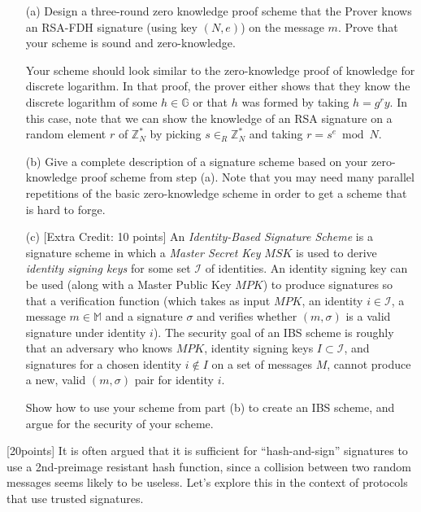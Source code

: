 \documentclass[11pt]{article}
\newcounter{qnum}
\newcommand{\question}[1]{\stepcounter{qnum}\bigskip\noindent{\bf \arabic{qnum}. #1.}}
\begin{document}
\begin{itemize}
\item[(a)] Design a three-round zero knowledge proof scheme that the Prover
  knows an RSA-FDH signature (using key $(N,e)$) on the message $m$.
  Prove that your scheme is sound and zero-knowledge.

  Your scheme should look similar to the zero-knowledge proof of knowledge for
  discrete logarithm.  In that proof, the prover either shows that they
  know the discrete logarithm of some $h \in \mathbb{G}$ or that $h$
  was formed  by taking $h = g^r y$.  In this case, note that we can
  show the knowledge of an RSA signature on a random element $r$ of
  $\mathbb{Z}_N^*$ by picking $s \in_R \mathbb{Z}_N^*$ and taking $r =
  s^e \bmod N$.

\item[(b)] Give a complete description of a signature scheme based on your
  zero-knowledge proof scheme from step (a).  Note that you may need
  many parallel repetitions of the basic zero-knowledge scheme in
  order to get a scheme that is hard to forge.

\item[(c)] [Extra Credit: 10 points] An {\em Identity-Based Signature Scheme} is a signature
  scheme in which a {\em Master Secret Key} $MSK$ is used to derive {\em
    identity signing keys} for some set $\mathcal{I}$ of identities.  An
  identity signing key can be used (along with a Master Public Key
  $MPK$) to produce signatures so that a verification function (which takes as input $MPK$,
  an identity $i \in \mathcal{I}$, a message $m \in \mathbb{M}$ and a
  signature $\sigma$ and verifies whether $(m,\sigma)$ is a valid
  signature under identity $i$).  The security goal of an IBS scheme
  is roughly that an adversary who knows $MPK$, identity signing keys $I \subset \mathcal{I}$,
  and signatures for a chosen identity $i \not\in I$ on a set of messages $M$, cannot
  produce a new, valid $(m,\sigma)$ pair for identity $i$.

  Show how to use your scheme from part (b) to create an IBS scheme,
  and argue for the security of your scheme.
\end{itemize}
\newpage
\question{Signature Substitution Attacks} [20points]
It is often argued that it is sufficient for ``hash-and-sign'' signatures to use
a 2nd-preimage resistant hash function, since a collision between two random
messages seems likely to be useless.  Let's explore this in the context of protocols that use trusted signatures.
\end{document}
